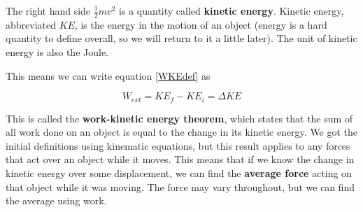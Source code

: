 \documentclass[12pt]{book}
\begin{document}
The right hand side $\frac{1}{2} m v^2$ is a quantity called \textbf{kinetic energy}. Kinetic energy, abbreviated $KE$, is the energy in the motion of an object (energy is a hard quantity to define overall, so we will return to it a little later). The unit of kinetic energy is also the Joule.

This means we can write equation \ref{WKEdef} as 

\begin{equation}
W_{ext} = KE_f - KE_i = \Delta KE
\label{WKEtheorem}
\end{equation}

This is called the \textbf{work-kinetic energy theorem}, which states that the sum of all work done on an object is equal to the change in its kinetic energy. We got the initial definitions using kinematic equations, but this result applies to any forces that act over an object while it moves. This means that if we know the change in kinetic energy over some displacement, we can find the \textbf{average force} acting on that object while it was moving. The force may vary throughout, but we can find the average using work.
\end{document}
